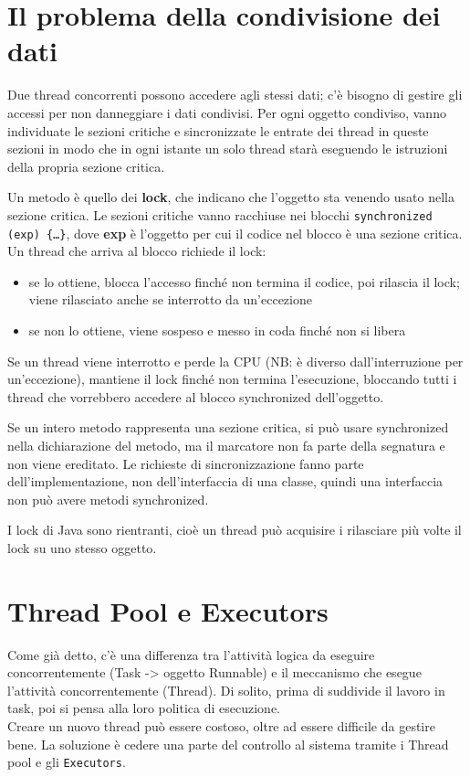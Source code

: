 \section{Il problema della condivisione dei dati}
Due thread concorrenti possono accedere agli stessi dati; c'è bisogno di gestire gli accessi per non danneggiare i dati condivisi. Per ogni oggetto condiviso, vanno individuate le sezioni critiche e sincronizzate le entrate dei thread in queste sezioni in modo che in ogni istante un solo thread starà eseguendo le istruzioni della propria sezione critica.

Un metodo è quello dei \textbf{lock}, che indicano che l'oggetto sta venendo usato nella sezione critica.
Le sezioni critiche vanno racchiuse nei blocchi \texttt{synchronized (exp) \{…\}}, dove \textbf{exp} è l'oggetto per cui il codice nel blocco è una sezione critica.
Un thread che arriva al blocco richiede il lock:
\begin{itemize}
\item se lo ottiene, blocca l'accesso finché non termina il codice, poi rilascia il lock; viene rilasciato anche se interrotto da un'eccezione
\item se non lo ottiene, viene sospeso e messo in coda finché non si libera
\end{itemize}
Se un thread viene interrotto e perde la CPU (NB: è diverso dall'interruzione per un'eccezione), mantiene il lock finché non termina l'esecuzione, bloccando tutti i thread che vorrebbero accedere al blocco synchronized dell'oggetto.

Se un intero metodo rappresenta una sezione critica, si può usare synchronized nella dichiarazione del metodo, ma il marcatore non fa parte della segnatura e non viene ereditato. Le richieste di sincronizzazione fanno parte dell'implementazione, non dell'interfaccia di una classe, quindi una interfaccia non può avere metodi synchronized.

I lock di Java sono rientranti, cioè un thread può acquisire i rilasciare più volte il lock su uno stesso oggetto.

\section{Thread Pool e Executors}
Come già detto, c'è una differenza tra l'attività logica da eseguire concorrentemente (Task -> oggetto Runnable) e il meccanismo che esegue l'attività concorrentemente (Thread). Di solito, prima di suddivide il lavoro in task, poi si pensa alla loro politica di esecuzione. \\
Creare un nuovo thread può essere costoso, oltre ad essere difficile da gestire bene. La soluzione è cedere una parte del controllo al sistema tramite i Thread pool e gli \texttt{Executors}.

